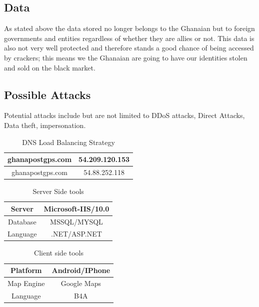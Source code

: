 \documentclass[conference,compsoc]{IEEEtran}
\begin{document}
\subsection{Data}
As stated above the data stored no longer belongs to the Ghanaian but to foreign governments and entities regardless of whether they are allies or not.
This data is also not very well protected and therefore stands a good chance of being accessed by crackers; this means we the Ghanaian are going to have our identities stolen and sold on the black market.

\subsection{Possible Attacks}
Potential attacks include but are not limited to DDoS attacks, Direct Attacks,
Data theft, impersonation.

\begin{table}[!t]
	\renewcommand{\arraystretch}{1.3}
	\caption{DNS Load Balancing Strategy}
	\label{dns_lbd}
	\centering
	\begin{tabular}{|c|c|}
		\hline
		ghanapostgps.com & 54.209.120.153\\
		\hline
		ghanapostgps.com & 54.88.252.118\\
		\hline
	\end{tabular}
\end{table}

\begin{table}[!t]
	\renewcommand{\arraystretch}{1.3}
	\caption{Server Side tools}
	\label{table_serverside}
	\centering
	\begin{tabular}{|c|c|}
		\hline
		Server & Microsoft-IIS/10.0\\
		\hline
		Database & MSSQL/MYSQL\\
		\hline
		Language & .NET/ASP.NET \\
		\hline
	\end{tabular}
\end{table}

\begin{table}[!t]
	\renewcommand{\arraystretch}{1.3}
	\caption{Client side tools}
	\label{table_clientside}
	\centering
	\begin{tabular}{|c|c|}
		\hline
		Platform & Android/IPhone\\
		\hline
		Map Engine & Google Maps\\
		\hline
		Language & B4A \\
		\hline
	\end{tabular}
\end{table}
\end{document}
